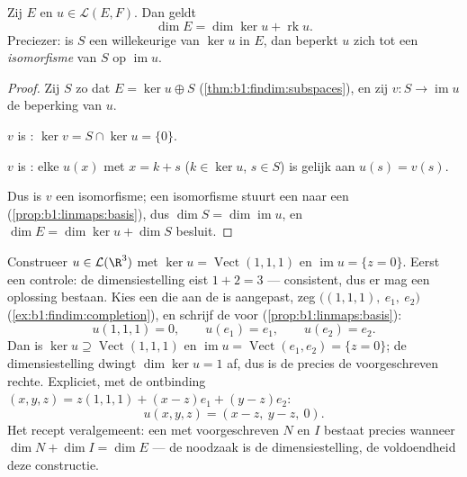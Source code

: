 \begin{theorem}[Dimensiestelling]\label{thm:b1:linmaps:ranknullity}
Zij $E$  en $u \in \mathcal{L}(E, F)$. Dan
geldt
\[
\dim E = \dim \ker u + \operatorname{rk} u .
\]
Preciezer: is $S$ een willekeurige   van
$\ker u$ in $E$, dan beperkt $u$ zich tot een \emph{isomorfisme}
van $S$ op $\operatorname{im} u$.
\end{theorem}

\begin{proof}
Zij $S$ zo dat $E = \ker u \oplus S$
(\cref{thm:b1:findim:subspaces}), en zij $v \colon S \to
\operatorname{im} u$ de beperking van $u$.

$v$ is : $\ker v = S \cap \ker u = \{0\}$.

$v$ is : elke $u(x)$ met $x = k + s$ ($k \in \ker u$, $s
\in S$) is gelijk aan $u(s) = v(s)$.

Dus is $v$ een isomorfisme; een isomorfisme stuurt een  naar
een  (\cref{prop:b1:linmaps:basis}), dus $\dim S =
\dim\operatorname{im} u$, en $\dim E = \dim\ker u + \dim S$ besluit.
\end{proof}

\begin{example}
\label{ex:b1:linmaps:tospec}
Construeer $u \in \mathcal{L}(\R^3)$ met $\ker u =
\operatorname{Vect}(1,1,1)$ en $\operatorname{im} u = \{z = 0\}$.
Eerst een controle: de dimensiestelling eist $1 + 2 = 3$ ---
consistent, dus er mag een oplossing bestaan. Kies een  die
aan de  is aangepast, zeg $\bigl((1,1,1),\ e_1,\ e_2\bigr)$
(\cref{ex:b1:findim:completion}), en schrijf de  voor
(\cref{prop:b1:linmaps:basis}):
\[
u(1,1,1) = 0, \qquad u(e_1) = e_1, \qquad u(e_2) = e_2 .
\]
Dan is $\ker u \supseteq \operatorname{Vect}(1,1,1)$ en
$\operatorname{im} u = \operatorname{Vect}(e_1, e_2) = \{z =
0\}$; de dimensiestelling dwingt $\dim\ker u = 1$ af, dus is de
 precies de voorgeschreven rechte. Expliciet, met de
ontbinding $(x, y, z) = z(1,1,1) + (x - z)e_1 + (y - z)e_2$:
\[
u(x, y, z) = (x - z,\ y - z,\ 0).
\]
Het recept veralgemeent: een  met
voorgeschreven  $N$ en  $I$ bestaat precies wanneer $\dim
N + \dim I = \dim E$ --- de noodzaak is de dimensiestelling, de
voldoendheid deze constructie.
\end{example}

